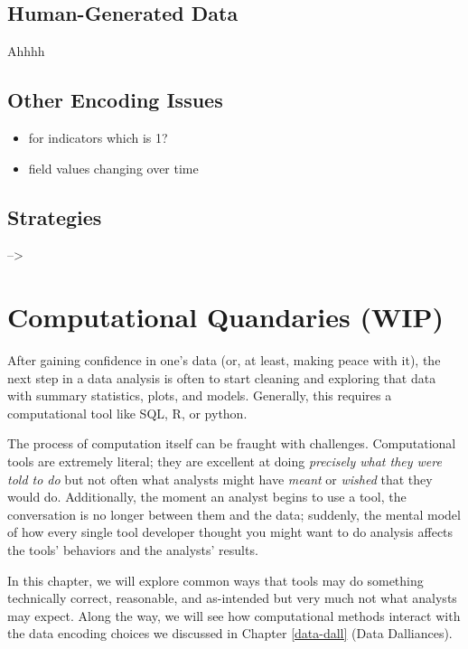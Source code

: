 \documentclass[
]{krantz}
\providecommand{\tightlist}{%
  \setlength{\itemsep}{0pt}\setlength{\parskip}{0pt}}
\begin{document}
\hypertarget{human-generated-data}{%
\section{Human-Generated Data}\label{human-generated-data}}

Ahhhh

\hypertarget{other-encoding-issues}{%
\section{Other Encoding Issues}\label{other-encoding-issues}}

\begin{itemize}
\tightlist
\item
  for indicators which is 1?
\item
  field values changing over time
\end{itemize}

\hypertarget{strategies}{%
\section{Strategies}\label{strategies}}

--\textgreater{}

\hypertarget{comp-quan}{%
\chapter{Computational Quandaries (WIP)}\label{comp-quan}}

After gaining confidence in one's data (or, at least, making peace with it), the next step in a data analysis is often to start cleaning and exploring that data with summary statistics, plots, and models.
Generally, this requires a computational tool like SQL, R, or python.

The process of computation itself can be fraught with challenges.
Computational tools are extremely literal; they are excellent at doing \emph{precisely what they were told to do} but not often what analysts might have \emph{meant} or \emph{wished} that they would do.
Additionally, the moment an analyst begins to use a tool, the conversation is no longer between them and the data;
suddenly, the mental model of how every single tool developer thought you might want to do analysis affects the tools' behaviors and the analysts' results.

In this chapter, we will explore common ways that tools may do something technically correct, reasonable, and as-intended but very much not what analysts may expect.
Along the way, we will see how computational methods interact with the data encoding choices we discussed in Chapter \ref{data-dall} (Data Dalliances).
\end{document}
